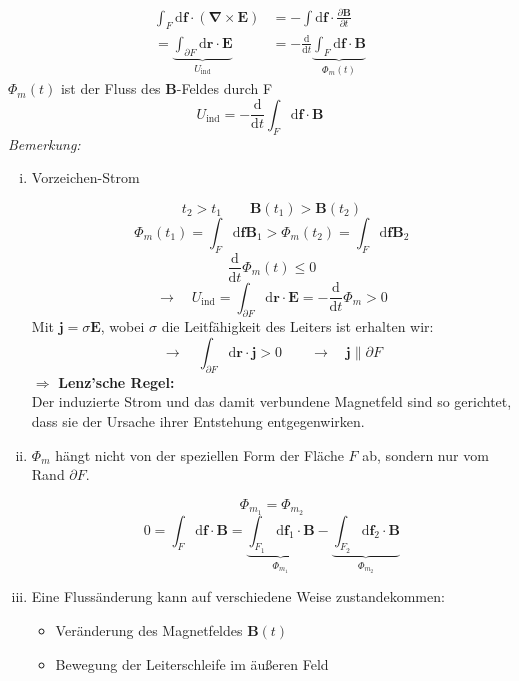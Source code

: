 \documentclass[titlepage,11pt,a4paper,ngerman]{report}
\newcommand{\tx}[1]{\textrm{#1}}
\newcommand{\ub}[1]{\underbrace{#1}}
\newcommand{\dd}{\tx{d}}
\newcommand{\prt}[2]{\frac{\partial #1}{\partial #2}}
\newcommand{\prd}[2]{\frac{\tx{d} #1}{\tx{d} #2}}
\renewcommand{\Phi}{\varPhi}
\renewcommand{\vec}[1]{\boldsymbol{#1}}
\begin{document}
\begin{align*}
\int_F \dd \vec{f} \cdot (\vec{\nabla} \times \vec{E}) &= - \int \dd \vec{f} \cdot \prt{\vec{B}}{t} \\
= \ub{\int_{\partial F} \dd \vec{r} \cdot \vec{E}}_{U_{\tx{ind}}} &= - \prd{}{t} \ub{\int_F \dd \vec{f} \cdot \vec{B}}_{\Phi_m (t)}
\end{align*}
$ \Phi_m(t) $ ist der Fluss des $ \vec{B} $-Feldes durch F
\begin{equation*}
U_{\tx{ind}} = - \prd{}{t} \int_F \dd \vec{f} \cdot \vec{B}
\end{equation*}
\emph{Bemerkung:}
\begin{enumerate}[i)]
	\item Vorzeichen-Strom
	
	
	\begin{equation*}
	t_2 > t_1 \qquad \vec{B}(t_1) > \vec{B}(t_2)
	\end{equation*}
	\begin{equation*}
	\Phi_m(t_1) = \int_F \dd \vec{f} \vec{B}_1 > \Phi_m(t_2) = \int_F \dd \vec{f} \vec{B}_2
	\end{equation*}
	\begin{equation*}
	\prd{}{t} \Phi_m(t) \le 0
	\end{equation*}
	\begin{equation*}
	\rightarrow \quad U_{\tx{ind}} = \int_{\partial F} \dd \vec{r} \cdot \vec{E} = - \prd{}{t} \Phi_m > 0
	\end{equation*}
	Mit $ \vec{j} = \sigma \vec{E} $, wobei $ \sigma $ die Leitfähigkeit des Leiters ist erhalten wir:
	\begin{equation*}
	\rightarrow \quad \int_{\partial F} \dd \vec{r} \cdot \vec{j} > 0 \qquad \rightarrow \quad \vec{j} \parallel \partial F
	\end{equation*}
	$ \Rightarrow $ \textbf{Lenz'sche Regel:}\\
	Der induzierte Strom und das damit verbundene Magnetfeld sind so gerichtet, dass sie der Ursache ihrer Entstehung entgegenwirken.
	
	
	\item $ \Phi_m $ hängt nicht von der speziellen Form der Fläche $ F $ ab, sondern nur vom Rand $ \partial F $.
	
	
	\begin{equation*}
	\Phi_{m_1} = \Phi_{m_2}
	\end{equation*}
	\begin{equation*}
	0 = \int_F \dd \vec{f} \cdot \vec{B} = \ub{\int_{F_1} \dd \vec{f}_1 \cdot \vec{B}}_{\Phi_{m_1}} - \ub{\int_{F_2} \dd \vec{f}_2 \cdot \vec{B}}_{\Phi_{m_2}}
	\end{equation*}
	\item Eine Flussänderung kann auf verschiedene Weise zustandekommen:
	\begin{itemize}
		\item Veränderung des Magnetfeldes $ \vec{B}(t) $
		\item  Bewegung der Leiterschleife im äußeren Feld
		

\end{itemize}
\end{enumerate}
\end{document}
